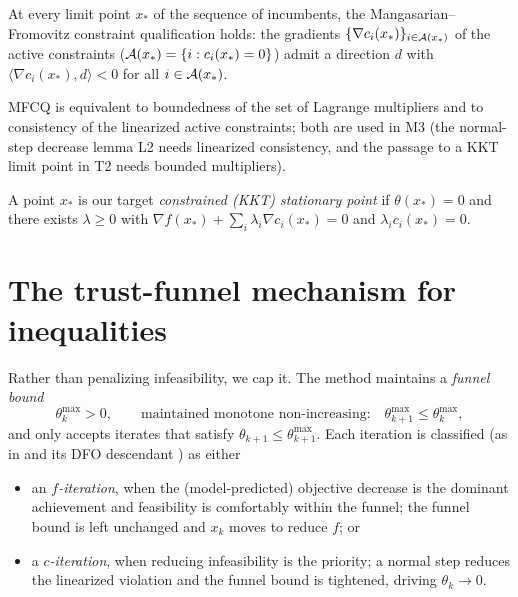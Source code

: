 \begin{assumption}
  \label{ass:mfcq}
  At every limit point $x_*$ of the sequence of incumbents, the
  Mangasarian--Fromovitz constraint qualification holds: the gradients
  $\{\nabla c_i(x_*)\}_{i\in\mathcal{A}(x_*)}$ of the active constraints
  ($\mathcal{A}(x_*)=\{i:c_i(x_*)=0\}$) admit a direction $d$ with
  $\langle\nabla c_i(x_*),d\rangle<0$ for all $i\in\mathcal{A}(x_*)$.
\end{assumption}

MFCQ is equivalent to boundedness of the set of Lagrange multipliers and to
consistency of the linearized active constraints; both are used in M3 (the
normal-step decrease lemma L2 needs linearized consistency, and the passage to a
KKT limit point in T2 needs bounded multipliers).

A point $x_*$ is our target \emph{constrained (KKT) stationary point} if
$\theta(x_*)=0$ and there exists $\lambda\ge0$ with
$\nabla f(x_*)+\sum_i\lambda_i\nabla c_i(x_*)=0$ and
$\lambda_i c_i(x_*)=0$.

\section{The trust-funnel mechanism for inequalities}
\label{sec:funnel}

Rather than penalizing infeasibility, we cap it. The method maintains a
\emph{funnel bound}
\begin{equation}
  \label{eq:funnel}
  \theta_k^{\max} > 0,
  \qquad \text{maintained monotone non-increasing:}\quad
  \theta_{k+1}^{\max}\le\theta_k^{\max},
\end{equation}
and only accepts iterates that satisfy $\theta_{k+1}\le\theta_{k+1}^{\max}$. Each
iteration is classified (as in \citealp{GouldToint2010} and its DFO descendant
\citealp{SampaioToint2015}) as either

\begin{itemize}
  \item an \emph{$f$-iteration}, when the (model-predicted) objective decrease is
        the dominant achievement and feasibility is comfortably within the funnel;
        the funnel bound is left unchanged and $x_k$ moves to reduce $f$; or
  \item a \emph{$c$-iteration}, when reducing infeasibility is the priority; a
        normal step reduces the linearized violation and the funnel bound is
        tightened, driving $\theta_k\to0$.
\end{itemize}

